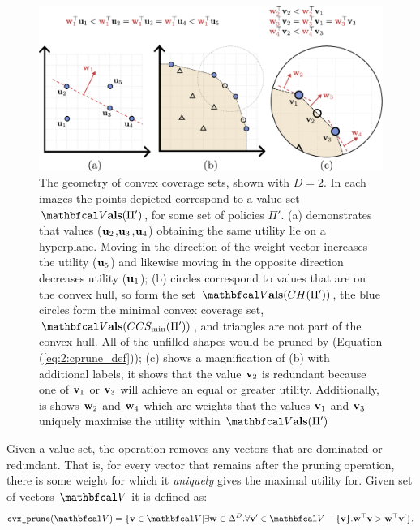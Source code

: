     \begin{figure}
        \centering\includegraphics[width=1.0\textwidth]{figures/ch2/ch_geometry.pdf} 
        \caption[The geometry of convex coverage sets.]{The geometry of convex coverage sets, shown with $D=2$. In each images the points depicted correspond to a value set $\valset(\Pi')$, for some set of policies $\Pi'$. (a) demonstrates that values ($\mathbf{u}_2$,$\mathbf{u}_3$,$\mathbf{u}_4$) obtaining the same utility lie on a hyperplane. Moving in the direction of the weight vector increases the utility ($\mathbf{u}_5$) and likewise moving in the opposite direction decreases utility ($\mathbf{u}_1$); (b) circles correspond to values that are on the convex hull, so form the set $\valset(CH(\Pi'))$, the blue circles form the minimal convex coverage set, $\valset(CCS_{\min}(\Pi'))$, and triangles are not part of the convex hull. All of the unfilled shapes would be pruned by \cprune (Equation (\ref{eq:2:cprune_def})); (c) shows a magnification of (b) with additional labels, it shows that the value $\mathbf{v}_2$ is redundant because one of $\mathbf{v}_1$ or $\mathbf{v}_3$ will achieve an equal or greater utility. Additionally, is shows $\mathbf{w}_2$ and $\mathbf{w}_4$ which are weights that the values $\mathbf{v}_1$ and $\mathbf{v}_3$ uniquely maximise the utility within $\valset(\Pi')$}
        \label{fig:2:convex_hull_geometry} 
    \end{figure}

    Given a value set, the \cprune\ewe operation removes any vectors that are dominated or redundant. That is, for every vector that remains after the pruning operation, there is some weight for which it \textit{uniquely} gives the maximal utility for. Given set of vectors $\bfcl{V}$ it is defined as:
    \begin{align}
        \cprune(\bfcl{V}) = \{\bff{v}\in\bfcl{V} | \exists \bff{w}\in\Delta^D. \forall \bff{v}'\in\bfcl{V}-\{\bff{v}\}. \bff{w}^\top \bff{v} > \bff{w}^\top \bff{v}' \}. \label{eq:2:cprune_def}
    \end{align}

